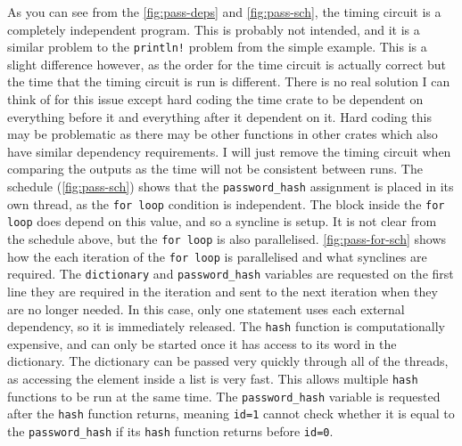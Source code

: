 As you can see from the \autoref{fig:pass-deps} and \autoref{fig:pass-sch}, the timing circuit is a completely independent program. This is probably not intended, and it is a similar problem to the \texttt{println!} problem from the simple example. This is a slight difference however, as the order for the time circuit is actually correct but the time that the timing circuit is run is different. There is no real solution I can think of for this issue except hard coding the time crate to be dependent on everything before it and everything after it dependent on it. Hard coding this may be problematic as there may be other functions in other crates which also have similar dependency requirements. I will just remove the timing circuit when comparing the outputs as the time will not be consistent between runs.
The schedule (\autoref{fig:pass-sch}) shows that the \texttt{password\_hash} assignment is placed in its own thread, as the \texttt{for loop} condition is independent. The block inside the \texttt{for loop} does depend on this value, and so a syncline is setup. It is not clear from the schedule above, but the \texttt{for loop} is also parallelised. \autoref{fig:pass-for-sch} shows how the each iteration of the \texttt{for loop} is parallelised and what synclines are required.
The \texttt{dictionary} and \texttt{password\_hash} variables are requested on the first line they are required in the iteration and sent to the next iteration when they are no longer needed. In this case, only one statement uses each external dependency, so it is immediately released. The \texttt{hash} function is computationally expensive, and can only be started once it has access to its word in the dictionary. The dictionary can be passed very quickly through all of the threads, as accessing the element inside a list is very fast. This allows multiple \texttt{hash} functions to be run at the same time. The \texttt{password\_hash} variable is requested after the \texttt{hash} function returns, meaning \texttt{id=1} cannot check whether it is equal to the \texttt{password\_hash} if its \texttt{hash} function returns before \texttt{id=0}.

